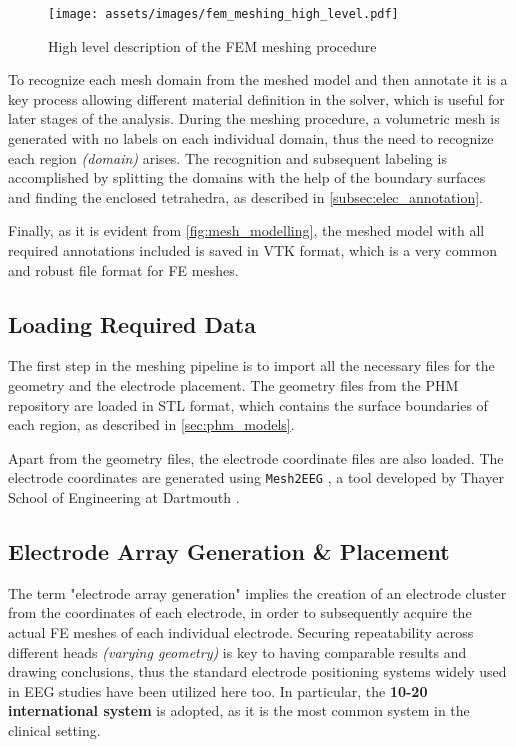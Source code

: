 \begin{figure}[H]
    \centering
    \texttt{[image: assets/images/fem\_meshing\_high\_level.pdf]}
    \caption{High level description of the \gls{FEM} meshing procedure}
    \label{fig:mesh_modelling}
\end{figure}

\noindent To recognize each mesh domain from the meshed model and then annotate it is a key process allowing different material definition in the solver, which is useful for later stages of the analysis. During the meshing procedure, a volumetric mesh is generated with no labels on each individual domain, thus the need to recognize each region \textit{(domain)} arises. The recognition and subsequent labeling is accomplished by splitting the domains with the help of the boundary surfaces and finding the enclosed tetrahedra, as described in \ref{subsec:elec_annotation}.

Finally, as it is evident from \autoref{fig:mesh_modelling}, the meshed model with all required annotations included is saved in \gls{VTK} format, which is a very common and robust file format for \gls{FE} meshes.

\subsection{Loading Required Data}

The first step in the meshing pipeline is to import all the necessary files for the geometry and the electrode placement. The geometry files from the \gls{PHM} repository \cite{ErikG.Lee2016} are loaded in \gls{STL} format, which contains the surface boundaries of each region, as described in \ref{sec:phm_models}.

Apart from the geometry files, the electrode coordinate files are also loaded. The electrode coordinates are generated using \texttt{Mesh2EEG} \cite{Giacometti2014}, a tool developed by Thayer School of Engineering at Dartmouth \cite{mesh2eeg_web}.

\subsection{Electrode Array Generation \& Placement}
\label{subsec:elec_placement}

The term "electrode array generation" implies the creation of an electrode cluster from the coordinates of each electrode, in order to subsequently acquire the actual \gls{FE} meshes of each individual electrode. Securing repeatability across different heads \textit{(varying geometry)} is key to having comparable results and drawing conclusions, thus the standard electrode positioning systems widely used in \gls{EEG} studies have been utilized here too. In particular, the \textbf{10-20 international system} \cite[chapter 13]{Malmivuo1995} is adopted, as it is the most common system in the clinical setting. 

